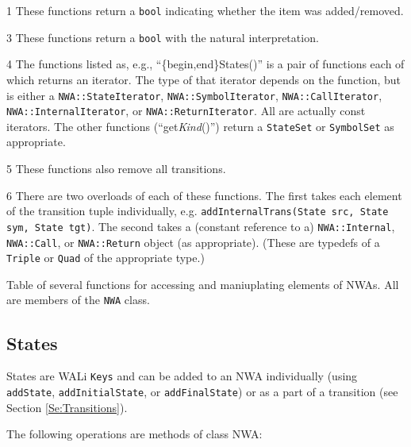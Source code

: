 \begin{sidewaystable}
\begin{threeparttable}
\begin{tablenotes}
  \item[1] These functions return a \texttt{bool} indicating whether the item
    was added/removed.
  \item[3] These functions return a \texttt{bool} with the natural
    interpretation.
  \item[4] The functions listed as, e.g., ``\{begin,end\}States()'' is a pair
    of functions each of which returns an iterator. The type of that iterator
    depends on the function, but is either a \texttt{NWA::StateIterator},
    \texttt{NWA::SymbolIterator}, \texttt{NWA::CallIterator},
    \texttt{NWA::InternalIterator}, or \texttt{NWA::ReturnIterator}. All are
    actually const iterators. The other functions (``get\textsl{Kind}()'')
    return a \texttt{StateSet} or \texttt{SymbolSet} as appropriate.
  \item[5] These functions also remove all transitions.
  \item[6] There are two overloads of each of these functions. The first
    takes each element of the transition tuple individually,
    e.g. \texttt{addInternalTrans(State src, State sym, State tgt)}. The
    second takes a (constant reference to a) \texttt{NWA::Internal},
    \texttt{NWA::Call}, or \texttt{NWA::Return} object (as
    appropriate). (These are typedefs of a \texttt{Triple} or \texttt{Quad}
    of the appropriate type.)
\end{tablenotes}
\caption{Table of several functions for accessing and maniuplating elements
  of NWAs. All are members of the \texttt{NWA} class.}
\end{threeparttable}
\end{sidewaystable}
\restoregeometry


\subsection{States}
\label{Se:States}

States are WALi \texttt{Keys} and can be added to an NWA
individually (using \texttt{addState}, \texttt{addInitialState}, or
\texttt{addFinalState}) or as a part of a transition (see Section
\ref{Se:Transitions}).  

\noindent The following operations are methods of class NWA:

